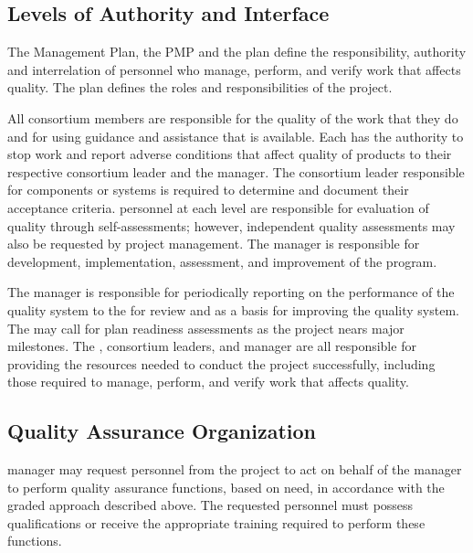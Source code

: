 \subsection{Levels of Authority and Interface}

The  Management Plan, the  PMP
and the   plan define the
responsibility, authority and interrelation of personnel who manage,
perform, and verify work that affects quality. The  plan
defines the  roles and responsibilities of the 
project.

All consortium members are responsible for the quality of the work that
they do and for using guidance and assistance that is available. Each
has the authority to stop work and report adverse conditions that
affect quality of  products to their respective
 consortium leader and the 
 manager. The consortium leader responsible for 
components or systems is required to determine and document their
acceptance criteria.  personnel at each level are
responsible for evaluation of quality through self-assessments;
however, independent quality assessments may also be requested by
project management.  The   manager is
responsible for development, implementation, assessment, and
improvement of the  program.

The   manager is responsible for
periodically reporting on the performance of the quality system to the
  for review and as a basis for improving
the quality system. The   may call for
 plan readiness assessments as the project nears major
milestones. The  , consortium leaders, and
  manager are all responsible for
providing the resources needed to conduct the project successfully,
including those required to manage, perform, and verify work that
affects quality.

\subsection{Quality Assurance Organization}

  manager may request personnel
from the  project to act on behalf of the
  manager to perform quality
assurance functions, based on need, in accordance with the graded
approach described above. The requested personnel must possess
qualifications or receive the appropriate training required to perform
these functions.

